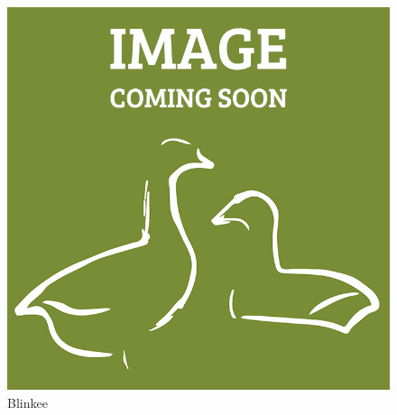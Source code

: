 \documentclass[a4paper,11pt,oneside]{scrreprt}
\begin{document}
\begin{figure}[H]
	\centering
	\includegraphics[clip, trim=0cm 0cm 0cm 0cm, scale=0.33]{./images/redesign.png}
	\caption{Blinkee}
	\label{fig:sub2}
\end{figure}

\clearpage
\end{document}

